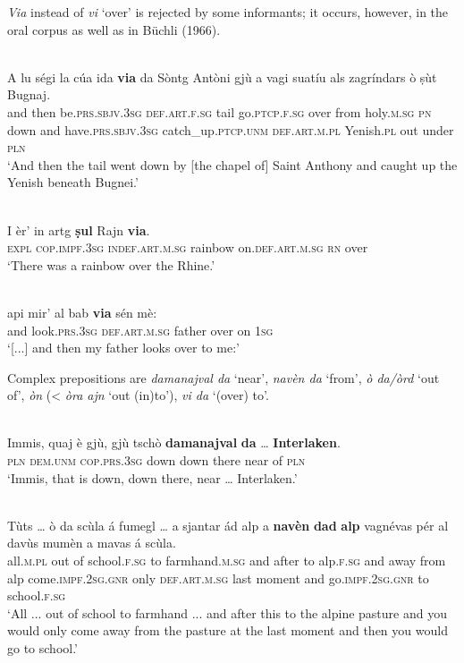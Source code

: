 \textit{Via} instead of \textit{vi} `over' is rejected by some informants; it occurs, however, in the oral corpus as well as in Büchli (1966).

\ea
\label{ex:via1}
 {\citealt[132]{Büchli1966}}\\
\gll A lu ségi la cúa ida \textbf{via} da Sòntg Antòni gjù a vagi suatíu als zagríndars ò ṣùt Bugnaj.\\
and then be.\textsc{prs.sbjv.3sg} \textsc{def.art.f.sg} tail go.\textsc{ptcp.f.sg} over from holy.\textsc{m.sg} \textsc{pn} down and have.\textsc{prs.sbjv.3sg} catch\_up.\textsc{ptcp.unm} \textsc{def.art.m.pl} Yenish.\textsc{pl} out under \textsc{pln}\\
\glt `And then the tail went down by [the chapel of] Saint Anthony and caught up the Yenish beneath Bugnei.'
\z

\ea
\label{ex:via2}
 {\citealt[15]{Büchli1966}}\\
\gll I èr' in artg \textbf{ṣul} Rajn \textbf{via}.\\
\textsc{expl} \textsc{cop.impf.3sg} \textsc{indef.art.m.sg} rainbow on.\textsc{def.art.m.sg} \textsc{rn} over\\
\glt `There was a rainbow over the Rhine.'
\z

\ea
\label{ex:via3}
\\
\gll  [...] api mir’ al bab \textbf{via} sén mè:\\
{} and look.\textsc{prs.3sg} \textsc{def.art.m.sg} father over on \textsc{1sg} \\
\glt `[...] and then my father looks over to me:'
\z

Complex prepositions are \textit{damanajval da} `near', \textit{navèn da} `from', \textit{ò da/òrd} `out of', \textit{òn} (< \textit{òra ajn} `out (in)to'), \textit{vi da} `(over) to'.

\ea
\label{}
\\
\gll  Immis, quaj è gjù, gjù tschò \textbf{damanajval} \textbf{da} … \textbf{Interlaken}.\\
\textsc{pln} \textsc{dem.unm} \textsc{cop.prs.3sg} down down there near of {} \textsc{pln} \\
\glt `Immis, that is down, down there, near … Interlaken.'
\z

\ea
\label{}
\\
\gll  Tùts … ò da scùla á fumegl … a sjantar ád alp a \textbf{navèn} \textbf{dad} \textbf{alp} vagnévas pér al davùs mumèn a mavas á scùla. \\
all.\textsc{m.pl} {} out of school.\textsc{f.sg} to farmhand.\textsc{m.sg} {} and after to alp.\textsc{f.sg} and away from alp come.\textsc{impf.2sg.gnr} only \textsc{def.art.m.sg} last moment and go.\textsc{impf.2sg.gnr} to school.\textsc{f.sg}\\
\glt `All ... out of school to farmhand ... and after this to the alpine pasture and you would only come away from the pasture at the last moment and then you would go to school.'
\z

